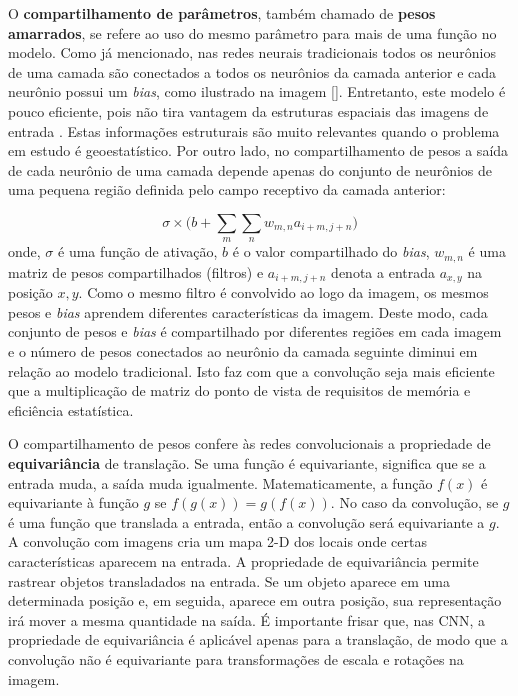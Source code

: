 O \textbf{compartilhamento de parâmetros}, também chamado de \textbf{pesos amarrados},
se refere ao uso do mesmo parâmetro para mais de uma função no modelo.
Como já mencionado, nas redes neurais tradicionais todos os neurônios de uma camada são conectados a todos os neurônios
da camada anterior e cada neurônio possui um \textit{bias}, como ilustrado na imagem \ref{}.
Entretanto, este modelo é pouco eficiente, pois não tira vantagem da estruturas espaciais das imagens
de entrada \cite{Gdfl16}. Estas informações estruturais são muito relevantes quando o problema em estudo é geoestatístico.
Por outro lado, no compartilhamento de pesos a saída de cada neurônio de uma camada depende apenas do conjunto de neurônios
de uma pequena região definida pelo campo receptivo da camada anterior:

\begin{equation}
 {\sigma} \times \bigg( b + \sum_{m}\sum_{n}{w_{m,n}a_{i+m,j+n} \bigg) }
\end{equation}
onde, $\sigma$ é uma função de ativação, $b$ é o valor compartilhado do \textit{bias}, $w_{m,n}$ é
uma matriz de pesos compartilhados (filtros) e $a_{i+m,j+n}$ denota a entrada $a_{x,y}$ na posição
$x,y$. Como o mesmo filtro é convolvido ao logo da imagem,
os mesmos pesos e \textit{bias} aprendem diferentes características da imagem. Deste modo, cada conjunto de pesos e \textit{bias} é compartilhado
por diferentes regiões em cada imagem e o número de pesos conectados ao neurônio
da camada seguinte diminui em relação ao modelo tradicional. Isto faz com que a convolução seja mais eficiente que a multiplicação de matriz
do ponto de vista de requisitos de memória e eficiência estatística.

O compartilhamento de pesos confere às redes convolucionais a propriedade de \textbf{equivariância} de
translação. Se uma função é equivariante, significa que se a entrada muda,
a saída muda igualmente. Matematicamente, a função $f(x)$ é equivariante à função $g$ se
$f(g(x)) = g(f(x))$. No caso da convolução, se $g$ é uma função que translada a entrada, então
a convolução será equivariante a $g$.
A convolução com imagens cria um mapa 2-D dos locais onde certas características aparecem na entrada.
A propriedade de equivariância permite rastrear objetos transladados na entrada. Se um objeto aparece
em uma determinada posição e, em seguida, aparece em outra posição, sua representação
irá mover a mesma quantidade na saída. É importante frisar que, nas CNN, a propriedade de equivariância
é aplicável apenas para a translação, de modo que a convolução não é equivariante para transformações 
de escala e rotações na imagem.

